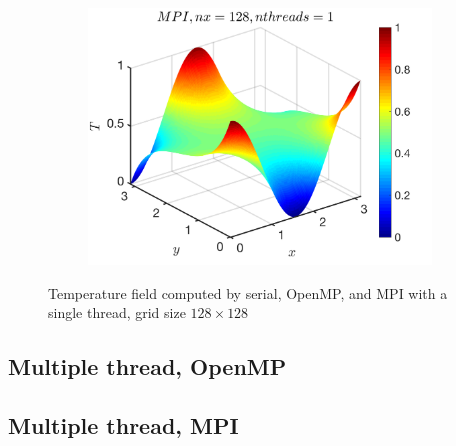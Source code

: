 \documentclass[a4paper]{article}
\begin{document}
\begin{figure}[H]
\begin{subfigure}[b]{0.32\textwidth}
        \end{subfigure}
        \
                \begin{subfigure}[b]{0.32\textwidth}   
            \centering 
            \includegraphics[width=\textwidth]{./Figure/heat_mpi_nx128_nth1_rank0.png} 
        \end{subfigure}
        \caption{Temperature field computed by serial, OpenMP, and MPI with a single thread, grid size $128\times128$}
    \end{figure}
    
    \subsection{Multiple thread, OpenMP}
    
    \subsection{Multiple thread, MPI}
    
\end{document}
